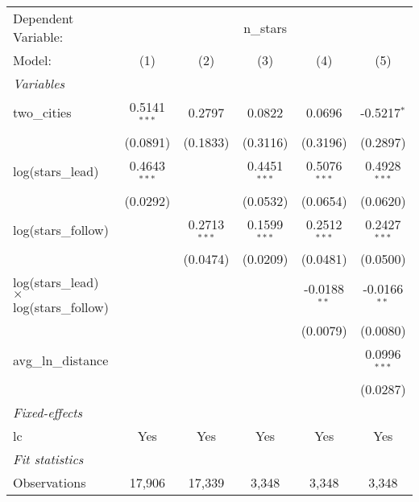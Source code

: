 
\begingroup
\centering
\begin{tabular}{lccccc}
   \tabularnewline \midrule \midrule
   Dependent Variable: & \multicolumn{5}{c}{n\_stars}\\
   Model:                                          & (1)            & (2)            & (3)            & (4)            & (5)\\  
   \midrule
   \emph{Variables}\\
   two\_cities                                     & 0.5141$^{***}$ & 0.2797         & 0.0822         & 0.0696         & -0.5217$^{*}$\\   
                                                   & (0.0891)       & (0.1833)       & (0.3116)       & (0.3196)       & (0.2897)\\   
   log(stars\_lead)                                & 0.4643$^{***}$ &                & 0.4451$^{***}$ & 0.5076$^{***}$ & 0.4928$^{***}$\\   
                                                   & (0.0292)       &                & (0.0532)       & (0.0654)       & (0.0620)\\   
   log(stars\_follow)                              &                & 0.2713$^{***}$ & 0.1599$^{***}$ & 0.2512$^{***}$ & 0.2427$^{***}$\\   
                                                   &                & (0.0474)       & (0.0209)       & (0.0481)       & (0.0500)\\   
   log(stars\_lead) $\times$ log(stars\_follow)    &                &                &                & -0.0188$^{**}$ & -0.0166$^{**}$\\   
                                                   &                &                &                & (0.0079)       & (0.0080)\\   
   avg\_ln\_distance                               &                &                &                &                & 0.0996$^{***}$\\   
                                                   &                &                &                &                & (0.0287)\\   
   \midrule
   \emph{Fixed-effects}\\
   lc                                              & Yes            & Yes            & Yes            & Yes            & Yes\\  
   \midrule
   \emph{Fit statistics}\\
   Observations                                    & 17,906         & 17,339         & 3,348          & 3,348          & 3,348\\  

\end{tabular}
